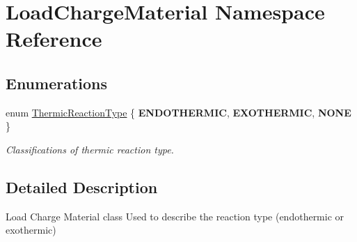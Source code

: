 \hypertarget{namespace_load_charge_material}{}\section{Load\+Charge\+Material Namespace Reference}
\label{namespace_load_charge_material}
\subsection*{Enumerations}
\begin{DoxyCompactItemize}
\item 
\mbox{\label{namespace_load_charge_material_a51d4263e865a5d86236622dd3fe23fd1}} 
enum \hyperlink{namespace_load_charge_material_a51d4263e865a5d86236622dd3fe23fd1}{Thermic\+Reaction\+Type} \{ {\bfseries E\+N\+D\+O\+T\+H\+E\+R\+M\+IC}, 
{\bfseries E\+X\+O\+T\+H\+E\+R\+M\+IC}, 
{\bfseries N\+O\+NE}
 \}\begin{DoxyCompactList}\small\item\em Classifications of thermic reaction type. \end{DoxyCompactList}
\end{DoxyCompactItemize}


\subsection{Detailed Description}
Load Charge Material class Used to describe the reaction type (endothermic or exothermic) 